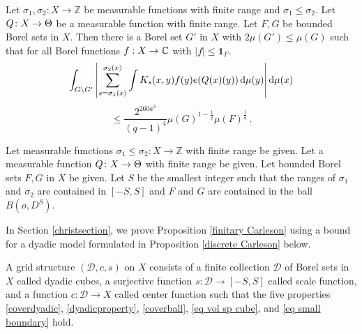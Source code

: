 \begin{prop}\label{finitary Carleson}
Let ${\sigma_1},\sigma_2\colon X\to \mathbb{Z}$ be measurable functions with finite range and ${\sigma_1}\leq  \sigma_2$. Let ${Q}\colon X\to \Theta$ be a measurable function with finite range. Let $F,G$ be bounded Borel sets in $X$. Then there is a Borel set $G'$ in $X$ with $2\mu(G')\leq  \mu(G)$ such that
for all Borel functions $f:X\to \mathbb{C}$ with $|f|\le \mathbf{1}_F$.
\begin{equation*}
    \int_{G \setminus G'} \left|\sum_{s={\sigma_1}(x)}^{{\sigma_2}(x)} \int K_s(x,y) f(y) e({Q}(x)(y))  \, \mathrm{d}\mu(y) \right| \mathrm{d}\mu(x)
\end{equation*}
\begin{equation}
    \label{eq-linearized}
    \le \frac{2^{260a^3}}{(q-1)^4} \mu(G)^{1-\frac{1}{q}}
     \mu(F)^{\frac 1 q}\,.
\end{equation}
\end{prop}
Let measurable functions ${\sigma_1}\leq \sigma_2\colon X\to \mathbb{Z}$ with finite range be given. Let a measurable function
${Q}\colon X\to \Theta$ with finite range
be given.
Let bounded Borel sets $F,G$ in $X$ be given.
Let $S$ be the smallest integer such that the ranges of
$\sigma_1$ and $\sigma_2$ are contained in $[-S,S]$ and $F$ and $G$ are contained
in the ball $B(o, D^S)$.


In Section \ref{christsection},
we prove Proposition \ref{finitary Carleson}
 using  a
bound for a dyadic model formulated in Proposition
\ref{discrete Carleson} below.

A grid structure $(\mathcal{D}, c, s)$ on $X$ consists of a finite collection $\mathcal{D}$  of Borel sets in $X$ called dyadic cubes, a surjective function  $s\colon \mathcal{D}\to [-S, S]$
called scale function,
and a function $c:\mathcal{D}\to X$
called center function such that the five properties
\eqref{coverdyadic},
\eqref{dyadicproperty}, \eqref{coverball},
\eqref{eq vol sp cube}, and \eqref{eq small boundary}
hold.

